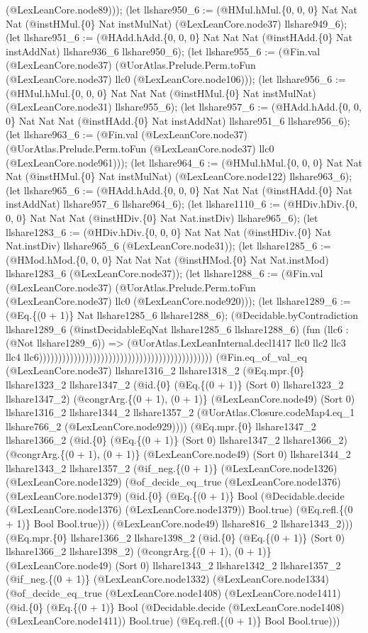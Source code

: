 \documentclass[11pt]{article}
\begin{document}
(@LexLeanCore.node89))); (let llshare950\_6 := (@HMul.hMul.\{0, 0, 0\} Nat Nat Nat (@instHMul.\{0\} Nat instMulNat) (@LexLeanCore.node37) llshare949\_6); (let llshare951\_6 := (@HAdd.hAdd.\{0, 0, 0\} Nat Nat Nat (@instHAdd.\{0\} Nat instAddNat) llshare936\_6 llshare950\_6); (let llshare955\_6 := (@Fin.val (@LexLeanCore.node37) (@UorAtlas.Prelude.Perm.toFun (@LexLeanCore.node37) llc0 (@LexLeanCore.node106))); (let llshare956\_6 := (@HMul.hMul.\{0, 0, 0\} Nat Nat Nat (@instHMul.\{0\} Nat instMulNat) (@LexLeanCore.node31) llshare955\_6); (let llshare957\_6 := (@HAdd.hAdd.\{0, 0, 0\} Nat Nat Nat (@instHAdd.\{0\} Nat instAddNat) llshare951\_6 llshare956\_6); (let llshare963\_6 := (@Fin.val (@LexLeanCore.node37) (@UorAtlas.Prelude.Perm.toFun (@LexLeanCore.node37) llc0 (@LexLeanCore.node961))); (let llshare964\_6 := (@HMul.hMul.\{0, 0, 0\} Nat Nat Nat (@instHMul.\{0\} Nat instMulNat) (@LexLeanCore.node122) llshare963\_6); (let llshare965\_6 := (@HAdd.hAdd.\{0, 0, 0\} Nat Nat Nat (@instHAdd.\{0\} Nat instAddNat) llshare957\_6 llshare964\_6); (let llshare1110\_6 := (@HDiv.hDiv.\{0, 0, 0\} Nat Nat Nat (@instHDiv.\{0\} Nat Nat.instDiv) llshare965\_6); (let llshare1283\_6 := (@HDiv.hDiv.\{0, 0, 0\} Nat Nat Nat (@instHDiv.\{0\} Nat Nat.instDiv) llshare965\_6 (@LexLeanCore.node31)); (let llshare1285\_6 := (@HMod.hMod.\{0, 0, 0\} Nat Nat Nat (@instHMod.\{0\} Nat Nat.instMod) llshare1283\_6 (@LexLeanCore.node37)); (let llshare1288\_6 := (@Fin.val (@LexLeanCore.node37) (@UorAtlas.Prelude.Perm.toFun (@LexLeanCore.node37) llc0 (@LexLeanCore.node920))); (let llshare1289\_6 := (@Eq.\{(0 + 1)\} Nat llshare1285\_6 llshare1288\_6); (@Decidable.byContradiction llshare1289\_6 (@instDecidableEqNat llshare1285\_6 llshare1288\_6) (fun (llc6 : (@Not llshare1289\_6)) => (@UorAtlas.LexLeanInternal.decl1417 llc0 llc2 llc3 llc4 llc6))))))))))))))))))))))))))))))))))))))))))))) (@Fin.eq\_of\_val\_eq (@LexLeanCore.node37) llshare1316\_2 llshare1318\_2 (@Eq.mpr.\{0\} llshare1323\_2 llshare1347\_2 (@id.\{0\} (@Eq.\{(0 + 1)\} (Sort 0) llshare1323\_2 llshare1347\_2) (@congrArg.\{(0 + 1), (0 + 1)\} (@LexLeanCore.node49) (Sort 0) llshare1316\_2 llshare1344\_2 llshare1357\_2 (@UorAtlas.Closure.codeMap4.eq\_1 llshare766\_2 (@LexLeanCore.node929)))) (@Eq.mpr.\{0\} llshare1347\_2 llshare1366\_2 (@id.\{0\} (@Eq.\{(0 + 1)\} (Sort 0) llshare1347\_2 llshare1366\_2) (@congrArg.\{(0 + 1), (0 + 1)\} (@LexLeanCore.node49) (Sort 0) llshare1344\_2 llshare1343\_2 llshare1357\_2 (@if\_neg.\{(0 + 1)\} (@LexLeanCore.node1326) (@LexLeanCore.node1329) (@of\_decide\_eq\_true (@LexLeanCore.node1376) (@LexLeanCore.node1379) (@id.\{0\} (@Eq.\{(0 + 1)\} Bool (@Decidable.decide (@LexLeanCore.node1376) (@LexLeanCore.node1379)) Bool.true) (@Eq.refl.\{(0 + 1)\} Bool Bool.true))) (@LexLeanCore.node49) llshare816\_2 llshare1343\_2))) (@Eq.mpr.\{0\} llshare1366\_2 llshare1398\_2 (@id.\{0\} (@Eq.\{(0 + 1)\} (Sort 0) llshare1366\_2 llshare1398\_2) (@congrArg.\{(0 + 1), (0 + 1)\} (@LexLeanCore.node49) (Sort 0) llshare1343\_2 llshare1342\_2 llshare1357\_2 (@if\_neg.\{(0 + 1)\} (@LexLeanCore.node1332) (@LexLeanCore.node1334) (@of\_decide\_eq\_true (@LexLeanCore.node1408) (@LexLeanCore.node1411) (@id.\{0\} (@Eq.\{(0 + 1)\} Bool (@Decidable.decide (@LexLeanCore.node1408) (@LexLeanCore.node1411)) Bool.true) (@Eq.refl.\{(0 + 1)\} Bool Bool.true))) 
\end{document}
